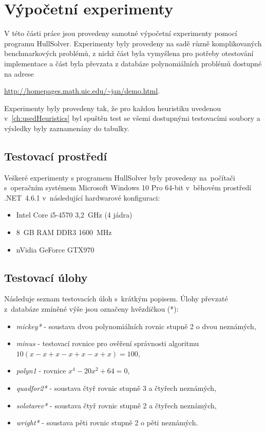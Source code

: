


\chapter{Výpočetní experimenty}
V této části práce jsou provedeny samotné výpočetní experimenty pomocí programu HullSolver. Experimenty byly provedeny na sadě různě komplikovaných benchmarkových problémů, z nichž část byla vymyšlena pro potřeby otestování implementace a část byla převzata z databáze polynomiálních problémů dostupné na adrese {\url{http://homepages.math.uic.edu/~jan/demo.html}.

Experimenty byly provedeny tak, že pro každou heuristiku uvedenou v~\ref{ch:usedHeuristics} byl spuštěn test se všemi dostupnými testovacími soubory a výsledky byly zaznamenány do tabulky.


\section{Testovací prostředí}
Veškeré experimenty s programem HullSolver byly provedeny na~počítači s~operačním systémem Microsoft Windows 10 Pro 64-bit v~běhovém prostředí .NET~4.6.1 v~následující hardwarové konfiguraci:

\begin{itemize}
\item Intel Core i5-4570 3,2~GHz (4 jádra)
\item 8~GB RAM DDR3 1600~MHz
\item nVidia GeForce GTX970
\end{itemize}

\section{Testovací úlohy}

Následuje seznam testovacích úloh s~krátkým popisem. Úlohy převzaté z~databáze zmíněné výše jsou označeny hvězdičkou (*):

\begin{itemize}
    \item \emph{mickey*} - soustava dvou polynomiálních rovnic stupně 2 o dvou neznámých,
    \item \emph{minus} - testovací rovnice pro ověření správnosti algoritmu $10(x - x + x - x + x - x + x) = 100$,
    \item \emph{polyn1} - rovnice $x^4 - 20x^2 + 64 = 0$,
    \item \emph{quadfor2*} - soustava čtyř rovnic stupně 3 a čtyřech neznámých,
    \item \emph{solotarev*} - soustava čtyř rovnic stupně 2 a čtyřech neznámých,
    \item \emph{wright*} - soustava pěti rovnic stupně 2 o pěti neznámých.
\end{itemize}

}
